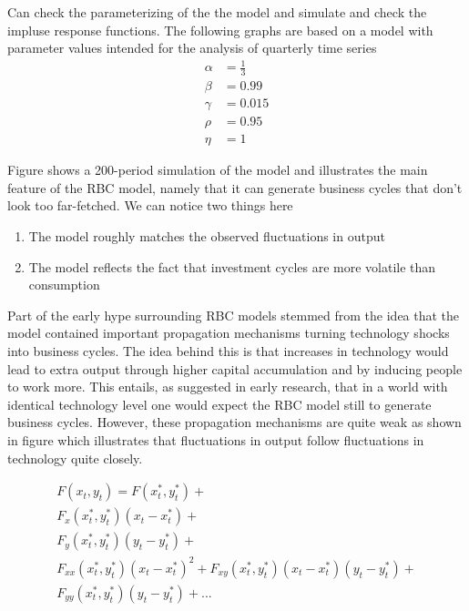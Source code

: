 \documentclass{beamer}
\begin{document}
\begin{frame}
  Can check the parameterizing of the the model and simulate and check the impluse response functions. 
The following graphs are based on a model with parameter values intended for the analysis of quarterly time series
\begin{align}
  \alpha &=\frac{1}{3}\\
  \beta &=0.99\\
  \gamma &=0.015\\
  \rho &= 0.95\\
  \eta &= 1
\end{align}
\end{frame}

\begin{frame}
  Figure shows a 200-period simulation of the model and illustrates the main feature of the RBC model, namely that it can generate business cycles that don't look too far-fetched. 
We can notice two things here
\begin{enumerate}
  \item The model roughly matches the observed fluctuations in output
  \item The model reflects the fact that investment cycles are more volatile than consumption
\end{enumerate}
\end{frame}

\begin{frame}
  Part of the early hype surrounding RBC models stemmed from the idea that the model contained important propagation mechanisms turning technology shocks into business cycles. 
The idea behind this is that increases in technology would lead to extra output through higher capital accumulation and by inducing people to work more. 
This entails, as suggested in early research, that in a world with identical technology level one would expect the RBC model still to generate business cycles. 
However, these propagation mechanisms are quite weak as shown in figure which illustrates that fluctuations in output follow fluctuations in technology quite closely.
\end{frame}

\begin{frame}

\begin{align*}
  F(x_t,y_t) = F(x_t^*,y^*_t) +\\ 
  F_x(x^*_t,y^*_t)(x_t-x^*_t) + \\
  F_y(x^*_t,y^*_t)(y_t-y^*_t) +\\
  F_{xx}(x^*_t,y^*_t)(x_t- x^*_t)^2+ 
  F_{xy}(x^*_t,y^*_t)(x_t−x^*_t) (y_t-y^*_t)+\\
  F_{yy}(x^*_t,y^*_t) (y_t-y^*_t) +...
\end{align*}

\end{frame}


\end{document}
